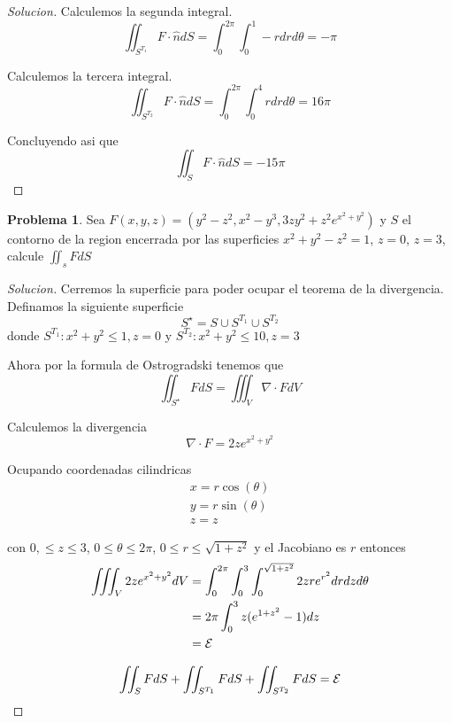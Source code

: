 \documentclass{article}
\theoremstyle{definition}
\newtheorem{problem}{Problema}
\newenvironment{solution}{\begin{proof}[Solucion]}{\end{proof}}
\begin{document}
\begin{solution}
  Calculemos la segunda integral.
  \begin{equation*}
    \iint_{S^{T_{1}}} F \cdot \hat{n} dS = \int_{0}^{2\pi}\int_{0}^{1} -r dr d\theta = -\pi
  \end{equation*}

  Calculemos la tercera integral.
  \begin{equation*}
    \iint_{S^{T_{2}}} F \cdot \hat{n} dS = \int_{0}^{2\pi}\int_{0}^{4} r dr d \theta = 16\pi
  \end{equation*}

  Concluyendo asi que
  \begin{equation*}
    \iint_{S} F \cdot \hat{n} dS = -15\pi
  \end{equation*}
\end{solution}

\begin{problem}
  Sea $F(x, y, z) = (y^{2} - z^{2}, x^{2} - y^{3}, 3zy^{2} + z^{2}e^{x^{2} + y^{2}})$ y $S$ el contorno de la region encerrada por las superficies $x^{2} + y^{2} - z^{2} = 1$, $z = 0$, $z = 3$, calcule $\iint_{s} F dS$
\end{problem}
\begin{solution}
  Cerremos la superficie para poder ocupar el teorema de la divergencia. Definamos la siguiente superficie
  \begin{equation*}
    S^{\star} = S \cup S^{T_{1}} \cup S^{T_{2}}
  \end{equation*}
  donde $S^{T_{1}}: x^{2} + y^{2} \leq 1,  z = 0$ y $S^{T_{2}}: x^{2} + y^{2} \leq 10, z = 3$

  Ahora por la formula de Ostrogradski tenemos que
  \begin{equation*}
    \iint_{S^{\star}} F dS = \iiint_{V} \nabla \cdot F dV
  \end{equation*}

  Calculemos la divergencia
  \begin{equation*}
    \nabla \cdot F = 2ze^{x^{2} + y^{2}}
  \end{equation*}

  Ocupando coordenadas cilindricas
  \begin{gather*}
    x = r \cos (\theta)\\
    y = r \sin (\theta)\\
    z = z
  \end{gather*}

  con $0, \leq z \leq 3$, $0 \leq \theta \leq 2\pi$, $0 \leq r \leq \sqrt{1 + z^{2}}$ y el Jacobiano es $r$ entonces
  \begin{align*}
    \iiint_{V} 2ze^{x^{2} + y^{2}} dV &= \int_{0}^{2\pi}\int_{0}^{3}\int_{0}^{\sqrt{1 + z^{2}}} 2zre^{r^{2}} dr dz d\theta\\
                                      &= 2\pi \int_{0}^{3} z(e^{1 + z^{2}} - 1) dz\\
    &= \mathcal{E}
  \end{align*}

  \begin{equation*}
    \iint_S F dS + \iint_{S^{T_1}} F dS + \iint_{S^{T_2}} F dS = \mathcal{E}
  \end{equation*}
\end{solution}
\end{document}
